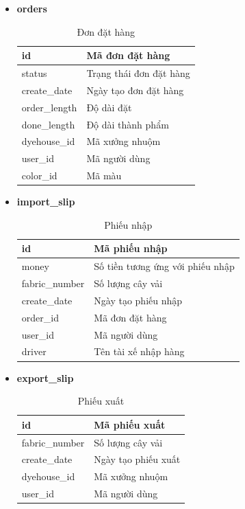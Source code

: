 \begin{itemize}
    \item \textbf{orders}
    \begin{table}[H]
        \centering
        \begin{tabular}{|m{3cm}|m{10cm}|}
        \hline 
            id & Mã đơn đặt hàng\\ \hline
            status & Trạng thái đơn đặt hàng \\ \hline
            create\_date & Ngày tạo đơn đặt hàng \\ \hline
            order\_length & Độ dài đặt\\ \hline
            done\_length & Độ dài thành phẩm\\ \hline
            dyehouse\_id & Mã xưởng nhuộm\\ \hline
            user\_id & Mã người dùng\\ \hline
            color\_id & Mã màu\\
        \hline 
        \end{tabular}
        \caption{Đơn đặt hàng}
        \label{orders}
    \end{table}
    
    \item \textbf{import\_slip}
    \begin{table}[H]
        \centering
        \begin{tabular}{|m{3cm}|m{10cm}|}
        \hline 
            id & Mã phiếu nhập\\ \hline
            money & Số tiền tương ứng với phiếu nhập \\ \hline
            fabric\_number & Số lượng cây vải\\ \hline
            create\_date & Ngày tạo phiếu nhập \\ \hline
            order\_id & Mã đơn đặt hàng\\ \hline
            user\_id & Mã người dùng\\ \hline
            driver & Tên tài xế nhập hàng\\
        \hline 
        \end{tabular}
        \caption{Phiếu nhập}
        \label{import_slip}
    \end{table}
    
    \newpage
    \item \textbf{export\_slip}
    \begin{table}[H]
        \centering
        \begin{tabular}{|m{3cm}|m{10cm}|}
        \hline 
            id & Mã phiếu xuất\\ \hline
            fabric\_number & Số lượng cây vải\\ \hline
            create\_date & Ngày tạo phiếu xuất \\ \hline
            dyehouse\_id & Mã xưởng nhuộm\\ \hline
            user\_id & Mã người dùng\\ 
        \hline 
        \end{tabular}
        \caption{Phiếu xuất}
        \label{export_slip}
    \end{table}
    

\end{itemize}
